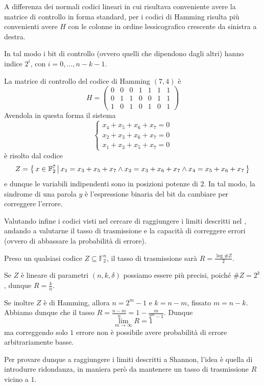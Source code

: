 A differenza dei normali codici lineari in cui risultava conveniente avere la matrice di controllo in forma standard,
per i codici di Hamming risulta più convenienti avere \(H\) con le colonne in ordine lessicografico crescente da sinistra a destra.

In tal modo i bit di controllo (ovvero quelli che dipendono dagli altri) hanno indice \(2^i\), con \(i=0,\ldots,n-k-1\).

\begin{example}{}
  La matrice di controllo del codice di Hamming \((7,4)\) è
  \[H = \begin{pmatrix}
    0 & 0 & 0 & 1 & 1 & 1 & 1 \\
    0 & 1 & 1 & 0 & 0 & 1 & 1 \\
    1 & 0 & 1 & 0 & 1 & 0 & 1
  \end{pmatrix}\]
  Avendola in questa forma il sistema
  \[\begin{cases}
    x_4 + x_5 + x_6 + x_7 = 0 \\
    x_2 + x_3 + x_6 + x_7 = 0 \\
    x_1 + x_3 + x_5 + x_7 = 0
  \end{cases}\]
  è risolto dal codice
  \[Z = \set{x \in \mathbb{F}_2^7}[x_1=x_3+x_5+x_7 \land x_2 = x_3 + x_6 + x_7 \land x_4 = x_5 + x_6 + x_7]\]
  e dunque le variabili indipendenti sono in posizioni potenze di \(2\).
  In tal modo, la sindrome di una parola \(y\) è l'espressione binaria del bit da cambiare per correggere l'errore.
\end{example}

Valutando infine i codici visti nel cercare di raggiungere i limiti descritti nel , andando a valutarne il tasso di trasmissione e la capacità di correggere errori (ovvero di abbassare la probabilità di errore).

Preso un qualsiasi codice \(Z \subseteq \mathbb{F}_2^n\), il tasso di trasmissione sarà \(R = \frac{\log \# Z}{2}\).

Se \(Z\) è lineare di parametri \((n,k,\delta)\) possiamo essere più precisi, poiché \(\# Z = 2^k\), dunque \(R = \frac{k}{n}\).

Se inoltre \(Z\) è di Hamming, allora \(n = 2^m -1\) e \(k = n - m\), fissato \(m = n-k\). Abbiamo dunque che il tasso \(R = \frac{n-m}{n} = 1 - \frac{m}{2^m-1}\).
Dunque
\[\lim_{m\to\infty} R = 1\]
ma correggendo solo \(1\) errore non è possibile avere probabilità di errore arbitrariamente basse.

Per provare dunque a raggiungere i limiti descritti a Shannon, l'idea è quella di introdurre ridondanza, in maniera però da mantenere un tasso di trasmissione \(R\) vicino a \(1\).

